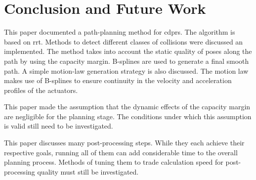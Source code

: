\section{Conclusion and Future Work}

	This paper documented a path-planning method for \glspl{cdpr}. The algorithm
	is based on \gls{rrt}. Methods to detect different classes of collisions
	were discussed an implemented. The method takes into account the static
	quality of poses along the path by using the capacity margin. B-splines are
	used to generate a final smooth path. A simple motion-law generation
	strategy is also discussed. The motion law makes use of B-splines to ensure
	continuity in the velocity and acceleration profiles of the actuators.

	This paper made the assumption that the dynamic effects of the capacity
	margin are negligible for the planning stage. The conditions under which
	this assumption is valid still need to be investigated.

	This paper discusses many post-processing steps. While they each achieve
	their respective goals, running all of them can add considerable time to the
	overall planning process. Methods of tuning them to trade calculation speed
	for post-processing quality must still be investigated.
